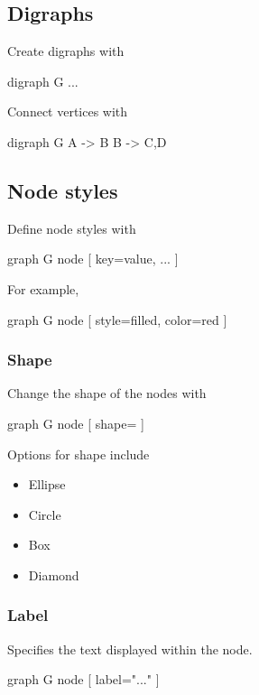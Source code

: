 \documentclass{report}
\begin{document}
    \pagebreak 
    \subsection{Digraphs}
    \bigbreak \noindent 
    Create digraphs with
    \bigbreak \noindent 
    \begin{cppcode}
        digraph G {
            ...
        }
    \end{cppcode}
    \bigbreak \noindent 
    Connect vertices with
    \bigbreak \noindent 
    \begin{cppcode}
        digraph G {
            A -> B
            B -> {C,D}
        }
    \end{cppcode}

    \pagebreak 
    \bigbreak \noindent 
    \subsection{Node styles}
    \bigbreak \noindent 
    Define node styles with 
    \bigbreak \noindent 
    \begin{cppcode}
        graph G {
            node [ key=value, ... ]
        }
    \end{cppcode}
    \bigbreak \noindent 
    For example, 
    \bigbreak \noindent 
    \begin{cppcode}
        graph G {
            node [ style=filled, color=red ]
        }
    \end{cppcode}

    \bigbreak \noindent 
    \subsubsection{Shape}
    \bigbreak \noindent 
    Change the shape of the nodes with
    \bigbreak \noindent 
    \begin{cppcode}
        graph G {
            node [ shape= ]
        }
    \end{cppcode}
    \bigbreak \noindent 
    Options for shape include
    \begin{itemize}
        \item Ellipse
        \item Circle
        \item Box
        \item Diamond
    \end{itemize}

    \bigbreak \noindent 
    \subsubsection{Label}
    \bigbreak \noindent 
    Specifies the text displayed within the node.
    \bigbreak \noindent 
    \begin{cppcode}
        graph G {
            node [ label="..." ]
        }
    \end{cppcode}
\end{document}

